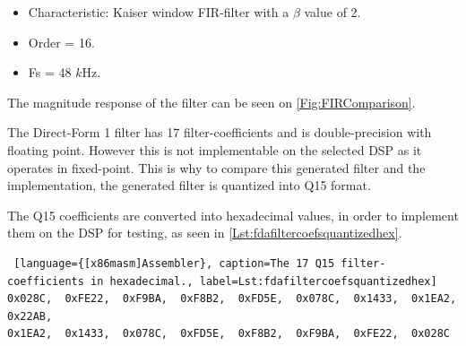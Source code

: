 
\begin{itemize}
	\item Characteristic: Kaiser window FIR-filter with a $\beta$ value of 2.
	\item Order = 16.
	\item Fs = 48 $k$Hz.
\end{itemize}


The magnitude response of the filter can be seen on \autoref{Fig:FIRComparison}. 



The Direct-Form 1 filter has 17 filter-coefficients and is double-precision with floating point. However this is not implementable on the selected DSP as it operates in fixed-point. This is why to compare this generated filter and the implementation, the generated filter is quantized into Q15 format.


The Q15 coefficients are converted into hexadecimal values, in order to implement them on the DSP for testing, as seen in \autoref{Lst:fdafiltercoefsquantizedhex}. 

\begin{lstlisting} [language={[x86masm]Assembler}, caption=The 17 Q15 filter-coefficients in hexadecimal., label=Lst:fdafiltercoefsquantizedhex]
0x028C,  0xFE22,  0xF9BA,  0xF8B2,  0xFD5E,  0x078C,  0x1433,  0x1EA2,  0x22AB,  
0x1EA2,  0x1433,  0x078C,  0xFD5E,  0xF8B2,  0xF9BA,  0xFE22,  0x028C
\end{lstlisting}

